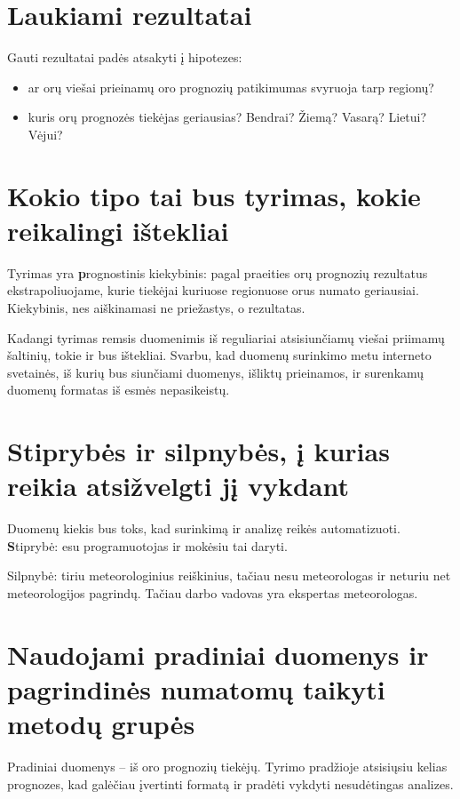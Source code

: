 \documentclass{article}
\begin{document}
\section{Laukiami rezultatai}

Gauti rezultatai padės atsakyti į hipotezes:
\begin{itemize}
    \item ar orų viešai prieinamų oro prognozių patikimumas svyruoja tarp
        regionų?
    \item kuris orų prognozės tiekėjas geriausias? Bendrai? Žiemą? Vasarą?
        Lietui? Vėjui?
\end{itemize}

\section{Kokio tipo tai bus tyrimas, kokie reikalingi ištekliai}

Tyrimas yra {\textbf prognostinis kiekybinis}: pagal praeities orų prognozių
rezultatus ekstrapoliuojame, kurie tiekėjai kuriuose regionuose orus numato
geriausiai. Kiekybinis, nes aiškinamasi ne priežastys, o rezultatas.

Kadangi tyrimas remsis duomenimis iš reguliariai atsisiunčiamų viešai priimamų
šaltinių, tokie ir bus ištekliai. Svarbu, kad duomenų surinkimo metu
interneto svetainės, iš kurių bus siunčiami duomenys, išliktų prieinamos, ir
surenkamų duomenų formatas iš esmės nepasikeistų.

\section{Stiprybės ir silpnybės, į kurias reikia atsižvelgti jį vykdant}

Duomenų kiekis bus toks, kad surinkimą ir analizę reikės automatizuoti.
{\textbf Stiprybė}: esu programuotojas ir mokėsiu tai daryti.

Silpnybė: tiriu meteorologinius reiškinius, tačiau nesu meteorologas ir neturiu
net meteorologijos pagrindų. Tačiau darbo vadovas yra ekspertas meteorologas.

\section{Naudojami pradiniai duomenys ir pagrindinės numatomų taikyti metodų grupės}

Pradiniai duomenys -- iš oro prognozių tiekėjų. Tyrimo pradžioje atsisiųsiu
kelias prognozes, kad galėčiau įvertinti formatą ir pradėti vykdyti
nesudėtingas analizes.

\printbibliography
\end{document}
